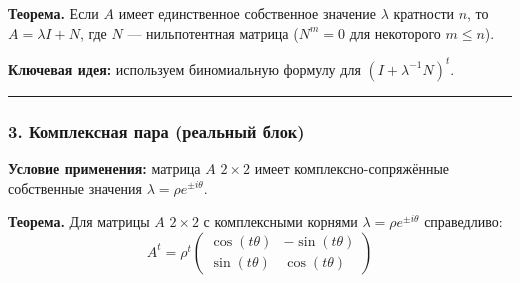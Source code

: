 \textbf{Теорема.} Если $A$ имеет единственное собственное значение $\lambda$ кратности $n$, то $A = \lambda I + N$, где $N$ — нильпотентная матрица ($N^m = 0$ для некоторого $m \leq n$).

\textbf{Ключевая идея:} используем биномиальную формулу для $(I + \lambda^{-1}N)^t$.



\bigskip
\hrule
\bigskip

\subsubsection*{3. Комплексная пара (реальный блок)}

\textbf{Условие применения:} матрица $A$ $2 \times 2$ имеет комплексно-сопряжённые собственные значения $\lambda = \rho e^{\pm i\theta}$.

\textbf{Теорема.} Для матрицы $A$ $2 \times 2$ с комплексными корнями $\lambda = \rho e^{\pm i\theta}$ справедливо:
\[
A^t = \rho^t \begin{pmatrix} \cos(t\theta) & -\sin(t\theta) \\ \sin(t\theta) & \cos(t\theta) \end{pmatrix}
\]

